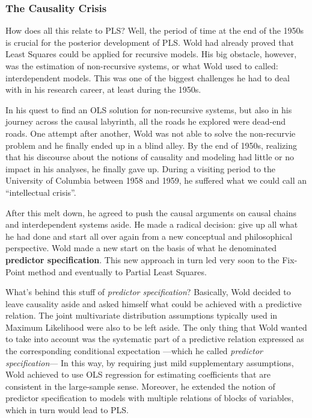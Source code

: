 \documentclass[12pt]{book}\usepackage{graphicx, color}
\begin{document}
\subsubsection*{The Causality Crisis}
How does all this relate to PLS? Well, the period of time at the end of the 1950s is crucial for the posterior development of PLS. Wold had already proved that Least Squares could be applied for recursive models. His big obstacle, however, was the estimation of non-recursive systems, or what Wold used to called: interdependent models. This was one of the biggest challenges he had to deal with in his research career, at least during the 1950s. 

In his quest to find an OLS solution for non-recursive systems, but also in his journey across the causal labyrinth, all the roads he explored were dead-end roads. One attempt after another, Wold was not able to solve the non-recurvie problem and he finally ended up in a blind alley. By the end of 1950s, realizing that his discourse about the notions of causality and modeling had little or no impact in his analyses, he finally gave up. During a visiting period to the University of Columbia between 1958 and 1959, he suffered what we could call an ``intellectual crisis''. 

After this melt down, he agreed to push the causal arguments on causal chains and interdependent systems aside. He made a radical decision: give up all what he had done and start all over again from a new conceptual and philosophical perspective. Wold made a new start on the basis of what he denominated \textbf{predictor specification}. This new approach in turn led very soon to the Fix-Point method and eventually to Partial Least Squares. 
 
What's behind this stuff of \textit{predictor specification}? Basically, Wold decided to leave causality aside and asked himself what could be achieved with a predictive relation. The joint multivariate distribution assumptions typically used in Maximum Likelihood were also to be left aside. The only thing that Wold wanted to take into account was the systematic part of a predictive relation expressed as the corresponding conditional expectation ---which he called \textit{predictor specification}--- In this way, by requiring just mild supplementary assumptions, Wold achieved to use OLS regression for estimating coefficients that are consistent in the large-sample sense. Moreover, he extended the notion of predictor specification to models with multiple relations of blocks of variables, which in turn would lead to PLS.
\end{document}
